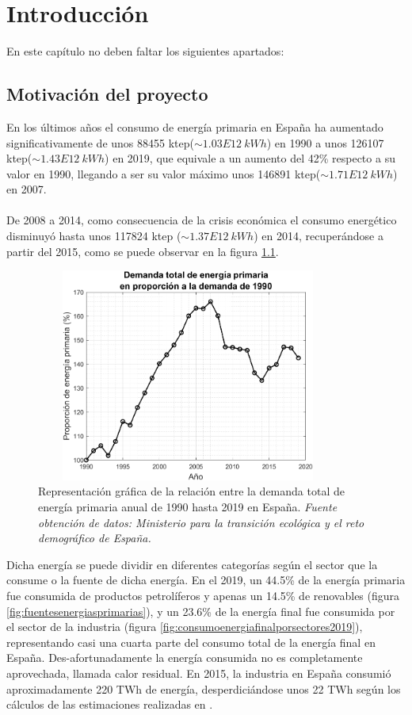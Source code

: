 \chapter{Introducción}

En este capítulo no deben faltar los siguientes apartados:

\section{Motivación del proyecto}

En los últimos años el consumo de energía primaria en España ha aumentado significativamente de unos 88455 ktep($\sim1.03E12 \ kWh$) en 1990 a unos 126107 ktep($\sim 1.43E12 \ kWh$) en 2019, que equivale a un aumento del 42\% respecto a su valor en 1990, llegando a ser su valor máximo unos 146891 ktep($\sim 1.71E12 \ kWh$) en 2007.\\\\
De 2008 a 2014, como consecuencia de la crisis económica el consumo energético disminuyó hasta unos 117824 ktep ($\sim 1.37E12 \ kWh$) en 2014, recuperándose a partir del 2015, como se puede observar en la figura \ref{fig:demandaenergiaprimariaproporcion1990}. \\


\begin{figure}[H]
	\centering
	\includegraphics[width=10cm, height=7cm]{figuras/DemandaEnergiaPrimariaProporcion1990}
	\caption[Relación entre demanda total de energía primaria anual]{Representación gráfica de la relación entre la demanda total de energía primaria anual de 1990 hasta 2019 en España. \textit{Fuente obtención de datos: Ministerio para la transición ecológica y el reto demográfico de España.} }
	\label{fig:demandaenergiaprimariaproporcion1990}
\end{figure}
Dicha energía se puede dividir en diferentes categorías según el sector que la consume o la fuente de dicha energía. En el 2019, un 44.5\% de la energía primaria fue consumida de productos petrolíferos y apenas un 14.5\% de renovables (figura \ref{fig:fuentesenergiasprimarias}), y un 23.6\% de la energía final fue consumida por el sector de la industria (figura \ref{fig:consumoenergiafinalporsectores2019}), representando casi una cuarta parte del consumo total de la energía final en España. Des-afortunadamente la energía consumida no es completamente aprovechada, llamada calor residual. En 2015, la industria en España consumió aproximadamente 220 TWh de energía, desperdiciándose unos 22 TWh según los cálculos de las estimaciones realizadas en \cite{wasteEnergyindustryEstimate}.

